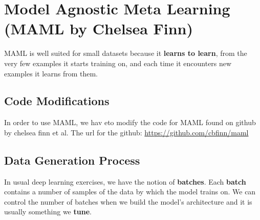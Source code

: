 \documentclass{article}
\begin{document}



\section{Model Agnostic Meta Learning (MAML by Chelsea Finn)}
MAML is well suited for small datasets because it \textbf{learns to learn}, from the very few examples it starts training on, and each time it encounters new examples it learns from them.

\subsection{Code Modifications}
In order to use MAML, we hav eto modify the code for MAML found on github by chelsea finn et al. The url for the github: \url{https://github.com/cbfinn/maml}

\subsection*{Data Generation Process}
In usual deep learning exercises, we have the notion of \textbf{batches}. Each \textbf{batch} contains a number of samples of the data by which the model trains on. We can control the number of batches when we build the model's architecture and it is usually something we \textbf{tune}.
\end{document}
